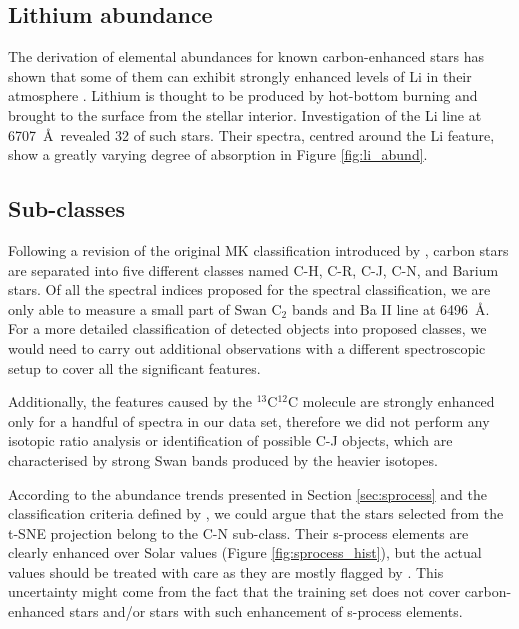 \subsection{Lithium abundance}
\label{sec:lithium}
The derivation of elemental abundances for known carbon-enhanced stars has shown that some of them can exhibit strongly enhanced levels of Li in their atmosphere \citep{1991A&A...245L...1A}. Lithium is thought to be produced by hot-bottom burning \citep{1974ApJ...187..555S} and brought to the surface from the stellar interior. Investigation of the Li line at 6707~\AA\ revealed 32 of such stars. Their spectra, centred around the Li feature, show a greatly varying degree of absorption in Figure \ref{fig:li_abund}.

\subsection{Sub-classes}
\label{sec:subclasses}
Following a revision of the original MK classification \citep{1941ApJ....94..501K} introduced by \citet{1996ApJS..105..419B}, carbon stars are separated into five different classes named \mbox{C-H}, \mbox{C-R}, \mbox{C-J}, \mbox{C-N}, and Barium stars. Of all the spectral indices proposed for the spectral classification, we are only able to measure a small part of Swan C$_2$ bands and Ba II line at 6496~\AA. For a more detailed classification of detected objects into proposed classes, we would need to carry out additional observations with a different spectroscopic setup to cover all the significant features. 

Additionally, the features caused by the $^{13}$C$^{12}$C molecule are strongly enhanced only for a handful of spectra in our data set, therefore we did not perform any isotopic ratio analysis or identification of possible C-J objects, which are characterised by strong Swan bands produced by the heavier isotopes.

According to the abundance trends presented in Section \ref{sec:sprocess} and the classification criteria defined by \citet{1996ApJS..105..419B}, we could argue that the stars selected from the t-SNE projection belong to the C-N sub-class. Their s-process elements are clearly enhanced over Solar values (Figure \ref{fig:sprocess_hist}), but the actual values should be treated with care as they are mostly flagged by \TC. This uncertainty might come from the fact that the training set does not cover carbon-enhanced stars and/or stars with such enhancement of s-process elements.

